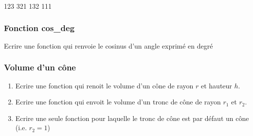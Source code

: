 \documentclass[letterpaper,10pt,english]{sphinxhowto}
\begin{document}
\begin{sphinxVerbatim}[commandchars=\\\{\}]
123
321
132
111
\end{sphinxVerbatim}


\subsubsection{Fonction cos\_deg}
\label{\detokenize{cours1_fonctions_corr_exercices:fonction-cos-deg}}
\sphinxAtStartPar
Ecrire une fonction qui renvoie le cosinus d’un angle exprimé en degré

\begin{sphinxVerbatim}[commandchars=\\\{\}]
    

 
     
\end{sphinxVerbatim}


\subsubsection{Volume d’un cône}
\label{\detokenize{cours1_fonctions_corr_exercices:volume-d-un-cone}}\begin{enumerate}
%
\item {} 
\sphinxAtStartPar
Ecrire une fonction qui renoit le volume d’un cône de rayon \(r\) et hauteur \(h\).

\item {} 
\sphinxAtStartPar
Ecrire une fonction qui envoit le volume d’un tronc de cône de rayon \(r_1\) et \(r_2\).

\item {} 
\sphinxAtStartPar
Ecrire une seule fonction pour laquelle le tronc de cône est par défaut un cône (i.e. \(r_2=1\))

\end{enumerate}
\end{document}
